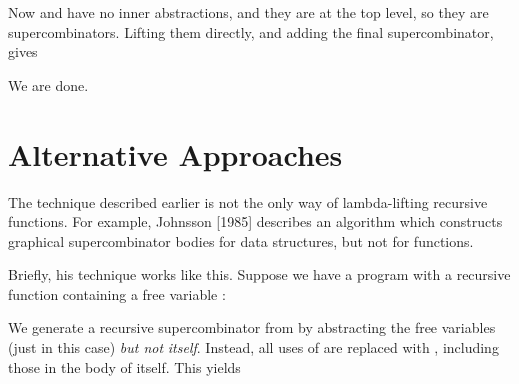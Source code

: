 Now  and  have no inner abstractions, and they are at the top
level, so they are supercombinators. Lifting them directly, and adding the
final  supercombinator, gives


\noindent
We are done.

\section{Alternative Approaches}

The technique described earlier is not the only way of lambda-lifting recursive
functions. For example, Johnsson [1985] describes an algorithm which
constructs graphical supercombinator bodies for data structures, but not for
functions.

Briefly, his technique works like this. Suppose we have a program with a
recursive function  containing a free variable :


\noindent
We generate a recursive supercombinator  from  by abstracting the free
variables (just  in this case) \textit{but not}  \textit{itself}. Instead, all uses of  are replaced
with , including those in the body of  itself. This yields

